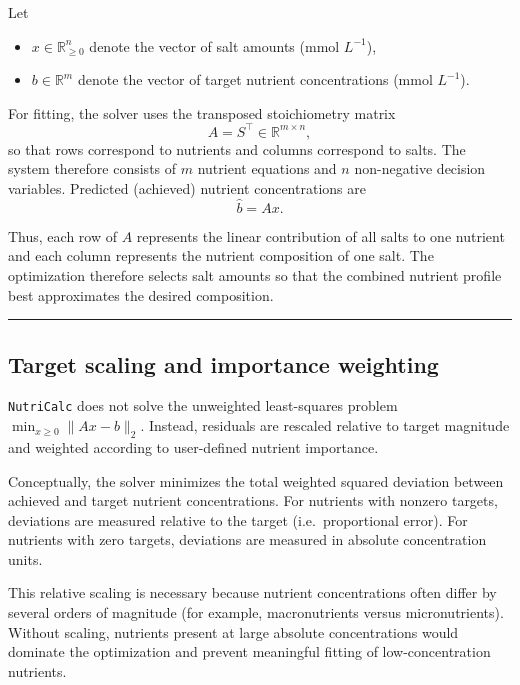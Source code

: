 \documentclass[
  letterpaper,
  DIV=11,
  numbers=noendperiod]{scrreprt}
\providecommand{\tightlist}{%
  \setlength{\itemsep}{0pt}\setlength{\parskip}{0pt}}
\begin{document}
Let

\begin{itemize}
\tightlist
\item
  \(x \in \mathbb{R}_{\ge 0}^n\) denote the vector of salt amounts (mmol
  \(L^{-1}\)),
\item
  \(b \in \mathbb{R}^m\) denote the vector of target nutrient
  concentrations (mmol \(L^{-1}\)).
\end{itemize}

For fitting, the solver uses the transposed stoichiometry matrix \[
A = S^\top \in \mathbb{R}^{m \times n},
\] so that rows correspond to nutrients and columns correspond to salts.
The system therefore consists of \(m\) nutrient equations and \(n\)
non-negative decision variables. Predicted (achieved) nutrient
concentrations are \[
\hat b = A x .
\]

Thus, each row of \(A\) represents the linear contribution of all salts
to one nutrient and each column represents the nutrient composition of
one salt. The optimization therefore selects salt amounts so that the
combined nutrient profile best approximates the desired composition.

\begin{center}\rule{0.5\linewidth}{0.5pt}\end{center}

\subsection{Target scaling and importance
weighting}\label{target-scaling-and-importance-weighting}

\texttt{NutriCalc} does not solve the unweighted least-squares problem
\(\min_{x \ge 0}\lVert Ax - b\rVert_2\). Instead, residuals are rescaled
relative to target magnitude and weighted according to user-defined
nutrient importance.

Conceptually, the solver minimizes the total weighted squared deviation
between achieved and target nutrient concentrations. For nutrients with
nonzero targets, deviations are measured relative to the target
(i.e.~proportional error). For nutrients with zero targets, deviations
are measured in absolute concentration units.

This relative scaling is necessary because nutrient concentrations often
differ by several orders of magnitude (for example, macronutrients
versus micronutrients). Without scaling, nutrients present at large
absolute concentrations would dominate the optimization and prevent
meaningful fitting of low-concentration nutrients.
\end{document}
